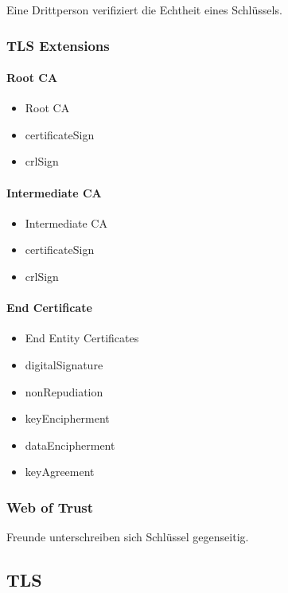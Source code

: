 Eine Drittperson verifiziert die Echtheit eines Schlüssels.

\subsubsection{TLS Extensions}

\paragraph{Root CA}
\begin{itemize}
	\item	Root CA
	\item	certificateSign
	\item	crlSign
\end{itemize}

\paragraph{Intermediate CA}
\begin{itemize}
	\item	Intermediate CA
	\item	certificateSign
	\item	crlSign
\end{itemize}

\paragraph{End Certificate}
\begin{itemize}
	\item	End Entity Certificates
	\item	digitalSignature
	\item	nonRepudiation
	\item	keyEncipherment
	\item	dataEncipherment
	\item	keyAgreement
\end{itemize}

\subsubsection{Web of Trust}

Freunde unterschreiben sich Schlüssel gegenseitig.


\subsection{TLS}

